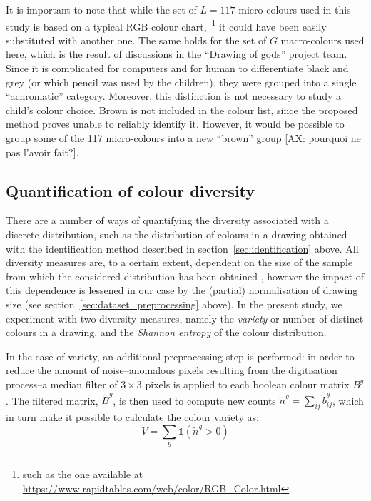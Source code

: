 \documentclass[11pt,a4paper]{article}
\begin{document}
It is important to note that while the set of $L=117$ micro-colours used in this study is based on a typical RGB colour chart,~\footnote{such as the one available at \url{https://www.rapidtables.com/web/color/RGB_Color.html}} it could have been easily substituted with another one. The same holds for the set of $G$ macro-colours used here, which is the result of discussions in the ``Drawing of gods'' project team. Since it is complicated for computers and for human to differentiate black and grey (or which pencil was used by the children), they were grouped into a single ``achromatic'' category. Moreover, this distinction is not necessary to study a child's colour choice. Brown is not included in the colour list, since the proposed method proves unable to reliably identify it. However, it would be possible to group some of the 117 micro-colours into a new ``brown'' group {\color{red} [AX: pourquoi ne pas l'avoir fait?]}. 

\subsection{Quantification of colour diversity}
\label{sec:diversity}

There are a number of ways of quantifying the diversity associated with a discrete distribution, such as the distribution of colours in a drawing obtained with the identification method described in section~\ref{sec:identification} above. All diversity measures are, to a certain extent, dependent on the size of the sample from which the considered distribution has been obtained \cite[see e.g.][]{TweedieBaayen1998}, however the impact of this dependence is lessened in our case by the (partial) normalisation of drawing size (see section~\ref{sec:dataset_preprocessing} above). In the present study, we experiment with two diversity measures, namely the {\em variety} or number of distinct colours in a drawing, and the {\em Shannon entropy} of the colour distribution.

In the case of variety, an additional preprocessing step is performed: in order to reduce the amount of noise--anomalous pixels resulting from the digitisation process--a median filter of \(3 \times 3\) pixels is applied to each boolean colour matrix $B^{g}$. The filtered matrix, $\tilde{B}^{g}$, is then used to compute new counts $\tilde{n}^{g} = \sum_{ij}\tilde{b}_{ij}^{g}$, which in turn make it possible to calculate the colour variety as:
\begin{equation}
	V = \sum_{g}\mathds{1}(\tilde{n}^{g} > 0)
\end{equation}
\end{document}
